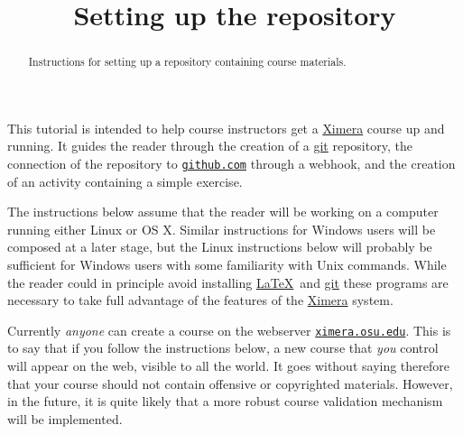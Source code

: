 \documentclass{ximera}
\title{Setting up the repository}
\begin{document}
\begin{abstract}
Instructions for setting up a repository containing course materials.
\end{abstract}
\maketitle

This tutorial is intended to help course instructors get a
\href{http://ximera.osu.edu}{\sf Ximera} 
course up and running. It guides the reader through the creation of a
\href{http://git-scm.com}{\sf git}
repository, the connection of the repository to
\href{http://github.com}{\tt github.com}
through a webhook, and the creation of an activity containing a 
simple exercise.

The instructions below assume that the reader will be
working on a computer running either Linux or OS X.
Similar instructions for Windows users will be composed
at a later stage, but the Linux instructions below will probably
be sufficient for Windows users with some familiarity with Unix commands.
While the reader could in principle avoid installing 
\href{http://texlive.org}{\LaTeX}\ and
\href{http://git-scm.com}{\sf git} these programs are necessary
to take full advantage of the features of the 
\href{http://ximera.osu.edu}{\sf Ximera} system.

\begin{warning} Currently {\em anyone} can
create a course on the webserver
\href{http://ximera.osu.edu}{\tt ximera.osu.edu}.
This is to say that if you follow the instructions below,
a new course that {\em you} control will appear on the web,
visible to all the world. It goes without saying therefore that
your course should not contain offensive or copyrighted
materials. However, in the future, it is quite likely that a
more robust course validation mechanism will be implemented.
\end{warning}
\end{document}
